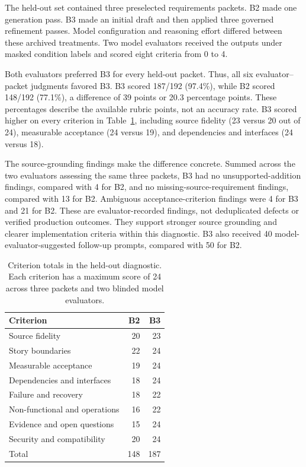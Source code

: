 \documentclass[pdflatex,sn-basic]{sn-jnl}
\begin{document}
The held-out set contained three preselected requirements packets. B2 made one generation pass. B3 made an initial draft and then applied three governed refinement passes. Model configuration and reasoning effort differed between these archived treatments. Two model evaluators received the outputs under masked condition labels and scored eight criteria from 0 to 4.

Both evaluators preferred B3 for every held-out packet. Thus, all six evaluator--packet judgments favored B3. B3 scored 187/192 (97.4\%), while B2 scored 148/192 (77.1\%), a difference of 39 points or 20.3 percentage points. These percentages describe the available rubric points, not an accuracy rate. B3 scored higher on every criterion in Table~\ref{tab:b2-b3-heldout-diagnostic}, including source fidelity (23 versus 20 out of 24), measurable acceptance (24 versus 19), and dependencies and interfaces (24 versus 18).

The source-grounding findings make the difference concrete. Summed across the two evaluators assessing the same three packets, B3 had no unsupported-addition findings, compared with 4 for B2, and no missing-source-requirement findings, compared with 13 for B2. Ambiguous acceptance-criterion findings were 4 for B3 and 21 for B2. These are evaluator-recorded findings, not deduplicated defects or verified production outcomes. They support stronger source grounding and clearer implementation criteria within this diagnostic. B3 also received 40 model-evaluator-suggested follow-up prompts, compared with 50 for B2.

\begin{table}[t]
\centering
\small
\caption{Criterion totals in the held-out diagnostic. Each criterion has a maximum score of 24 across three packets and two blinded model evaluators.}
\label{tab:b2-b3-heldout-diagnostic}
\begin{tabularx}{\columnwidth}{@{}Xrr@{}}
\toprule
Criterion & B2 & B3 \\
\midrule
Source fidelity & 20 & 23 \\
Story boundaries & 22 & 24 \\
Measurable acceptance & 19 & 24 \\
Dependencies and interfaces & 18 & 24 \\
Failure and recovery & 18 & 22 \\
Non-functional and operations & 16 & 22 \\
Evidence and open questions & 15 & 24 \\
Security and compatibility & 20 & 24 \\
\midrule
Total & 148 & 187 \\
\bottomrule
\end{tabularx}
\end{table}
\end{document}
